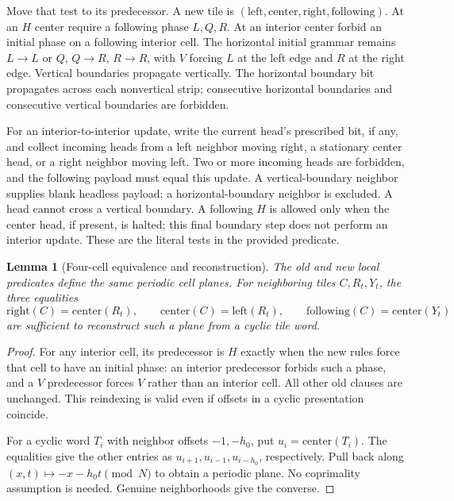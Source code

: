 \documentclass[11pt,a4paper]{article}
\newtheorem{lemma}[theorem]{Lemma}
\theoremstyle{remark}\newtheorem{remark}[theorem]{Remark}
\begin{document}
Move that test to its predecessor. A new tile is
\((\mathrm{left},\mathrm{center},\mathrm{right},\mathrm{following})\).
At an \(H\) center require a following phase \(L,Q,R\). At an
interior center forbid an initial phase on a following interior cell.
The horizontal initial grammar remains
\(L\to L\text{ or }Q\), \(Q\to R\), \(R\to R\), with
\(V\) forcing \(L\) at the left edge and \(R\) at the right edge.
Vertical boundaries propagate vertically. The horizontal boundary bit
propagates across each nonvertical strip; consecutive horizontal
boundaries and consecutive vertical boundaries are forbidden.

For an interior-to-interior update, write the current head's prescribed
bit, if any, and collect incoming heads from a left neighbor moving
right, a stationary center head, or a right neighbor moving left. Two
or more incoming heads are forbidden, and the following payload must
equal this update. A vertical-boundary neighbor supplies blank headless
payload; a horizontal-boundary neighbor is excluded. A head cannot
cross a vertical boundary. A following \(H\) is allowed only when the
center head, if present, is halted; this final boundary step does not
perform an interior update. These are the literal tests in the provided
predicate.

\begin{lemma}[Four-cell equivalence and reconstruction]\label{lem:fourcells}
The old and new local predicates define the same periodic cell planes.
For neighboring tiles \(C,R_t,Y_t\), the three equalities
\[
 \mathrm{right}(C)=\mathrm{center}(R_t),\qquad
 \mathrm{center}(C)=\mathrm{left}(R_t),\qquad
 \mathrm{following}(C)=\mathrm{center}(Y_t)
\]
are sufficient to reconstruct such a plane from a cyclic tile word.
\end{lemma}
\begin{proof}
For any interior cell, its predecessor is \(H\) exactly when the new
rules force that cell to have an initial phase: an interior predecessor
forbids such a phase, and a \(V\) predecessor forces \(V\) rather
than an interior cell. All other old clauses are unchanged. This
reindexing is valid even if offsets in a cyclic presentation coincide.

For a cyclic word \(T_i\) with neighbor offsets \(-1,-h_0\), put
\(u_i=\mathrm{center}(T_i)\). The equalities give the other entries
as \(u_{i+1},u_{i-1},u_{i-h_0}\), respectively. Pull back along
\((x,t)\mapsto-x-h_0t\pmod N\) to obtain a periodic plane. No
coprimality assumption is needed. Genuine neighborhoods give the
converse.
\end{proof}
\end{document}

